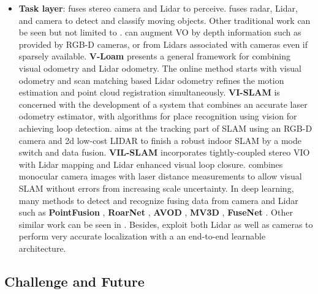 \documentclass[journal,transmag]{IEEEtran}
\begin{document}
\begin{itemize}
    \item \textbf{Task layer}: \cite{aycard2011intersection} fuses stereo camera and Lidar to perceive. \cite{chavez2015multiple} fuses radar, Lidar, and camera to detect and classify moving objects. Other traditional work can be seen but not limited to \cite{cho2014multi} \cite{wang2011integrating}\cite{wan2018robust}. \cite{zhang2014real} can augment VO by depth information such as provided by RGB-D cameras, or from Lidars associated with cameras even if sparsely available. \textbf{V-Loam} \cite{zhang2015visual} presents a general framework for combining visual odometry and Lidar odometry. The online method starts with visual odometry and scan matching based Lidar odometry refines the motion estimation and point cloud registration simultaneously. \textbf{VI-SLAM} \cite{nava2018visual} is concerned with the development of a system that combines an accurate laser odometry estimator, with algorithms for place recognition using vision for achieving loop detection. \cite{xu2018slam} aims at the tracking part of SLAM using an RGB-D camera and 2d low-cost LIDAR to finish a robust indoor SLAM by a mode switch and data fusion. \textbf{VIL-SLAM} \cite{shao2019stereo} incorporates tightly-coupled stereo VIO with Lidar mapping and Lidar enhanced visual loop closure. \cite{andert2015lidar} combines monocular camera images with laser distance measurements to allow visual SLAM without errors from increasing scale uncertainty. In deep learning, many methods to detect and recognize fusing data from camera and Lidar such as \textbf{PointFusion} \cite{xu2018pointfusion}, \textbf{RoarNet} \cite{shin2018roarnet}, \textbf{AVOD} \cite{ku2018joint}, \textbf{MV3D} \cite{chen2017multi}, \textbf{FuseNet} \cite{hazirbas2016fusenet}. Other similar work can be seen in \cite{wang2018fusing}. Besides, \cite{liang2018deep} exploit both Lidar as well as cameras to perform very accurate localization with a  an end-to-end learnable architecture.

\end{itemize}

\subsection{Challenge and Future}
\end{document}
